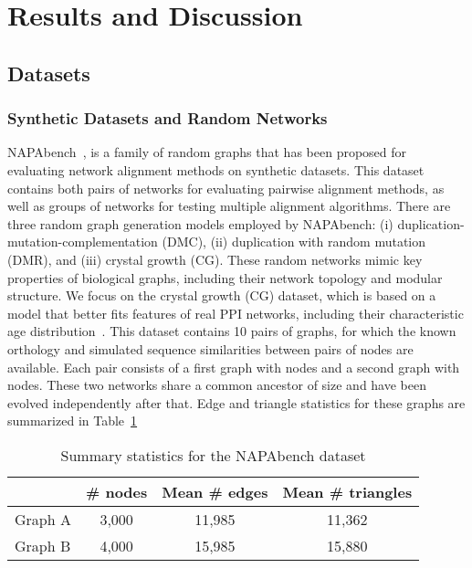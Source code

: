 \documentclass[10pt, journal, compsoc, final]{IEEEtran}
\begin{document}
\section{Results and Discussion}
\label{sec:results}

\subsection{Datasets}

\subsubsection{Synthetic Datasets and Random Networks}

NAPAbench~\cite{NAPAbench}, is a family of random graphs that has been proposed for 
evaluating network alignment methods on synthetic datasets. This dataset contains both pairs of 
networks for evaluating pairwise alignment methods, as well as groups of networks for testing 
multiple alignment algorithms. There are three random graph generation models 
employed by NAPAbench: (i) duplication-mutation-complementation (DMC), (ii) duplication with 
random mutation (DMR), and (iii) crystal growth (CG). These random 
networks mimic key properties of biological graphs, including their network topology and modular structure.
We focus on the crystal growth (CG) dataset, which is based on a model that better fits features of real PPI networks, 
including their characteristic age distribution~\cite{Kim2008}.
This dataset contains 10 pairs of graphs, for which the known orthology and simulated 
sequence similarities between pairs of nodes are available. Each pair consists of a first graph 
 with  nodes and a second graph  with  nodes. These two networks share a 
common ancestor of size  and have been evolved independently after that.  
Edge and triangle statistics for these graphs are summarized in 
Table~\ref{table:netStats_NAPA}

\begin{table}[!t]
\caption{Summary statistics for the NAPAbench dataset}
\label{table:netStats_NAPA}
\centering
\begin{tabular}{lccc}
\toprule
&\# nodes	&Mean \# edges	&Mean \# triangles\\	\midrule
Graph A& 3,000 & 11,985	&11,362\\
Graph B& 4,000 & 15,985	&15,880 \\
\bottomrule
\end{tabular}
\end{table}
\end{document}
